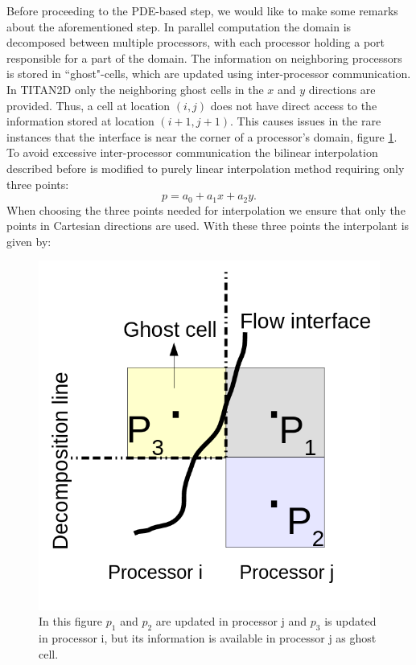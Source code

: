 \documentclass[letterpaper,10pt]{article}
\begin{document}
Before proceeding to the PDE-based step, we would like to make some remarks about the aforementioned step. 
In parallel computation the domain is decomposed between multiple processors, with each processor holding a port responsible for a part of the domain. 
The information on neighboring processors is stored in ``ghost"-cells, which are updated using inter-processor communication. In TITAN2D only the neighboring ghost
cells in the $x$ and $y$ directions are provided. Thus, a cell at location $(i,j)$ does not have direct access to the information stored at location $(i+1, j+1)$. 
This causes issues in the rare instances that the interface is near the corner of a processor's domain, figure \ref{fig:surf_interp}. To avoid 
excessive inter-processor communication the bilinear interpolation described before is modified to purely linear interpolation method requiring 
only three points:
\begin{equation}
\label{Surface}
p=a_0+a_1 x+a_2 y.
\end{equation} 
When choosing the three points needed for interpolation we ensure that only the points in Cartesian directions are used.
With these three points the interpolant is given by:
\begin{figure}[ht]
\centering
\includegraphics[scale=.25]{IMAGES/surf_interp.png}
\caption{In this figure $p_1$ and $p_2$ are updated in processor j and $p_3$ is updated in processor i, but its information is available in processor j as ghost cell. }
                \label{fig:surf_interp}
\end{figure}
\end{document}
